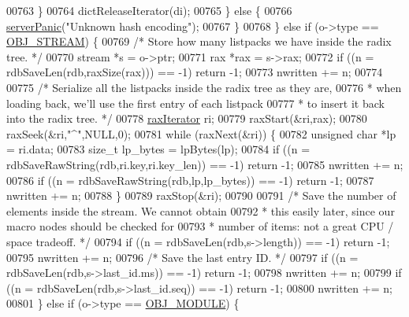 \begin{DoxyCode}
{{{{{{{{00763             \}
00764             dictReleaseIterator(di);
00765         \} \textcolor{keywordflow}{else} \{
00766             \hyperlink{server_8h_a11cc378e7778a830b41240578de3b204}{serverPanic}(\textcolor{stringliteral}{"Unknown hash encoding"});
00767         \}
00768     \} \textcolor{keywordflow}{else} \textcolor{keywordflow}{if} (o->type == \hyperlink{server_8h_a2c2cc41300ca6b9daca7ea8a6d66edc6}{OBJ\_STREAM}) \{
00769         \textcolor{comment}{/* Store how many listpacks we have inside the radix tree. */}
00770         stream *s = o->ptr;
00771         rax *rax = s->rax;
00772         \textcolor{keywordflow}{if} ((n = rdbSaveLen(rdb,raxSize(rax))) == -1) \textcolor{keywordflow}{return} -1;
00773         nwritten += n;
00774 
00775         \textcolor{comment}{/* Serialize all the listpacks inside the radix tree as they are,}
00776 \textcolor{comment}{         * when loading back, we'll use the first entry of each listpack}
00777 \textcolor{comment}{         * to insert it back into the radix tree. */}
00778         \hyperlink{structraxIterator}{raxIterator} ri;
00779         raxStart(&ri,rax);
00780         raxSeek(&ri,\textcolor{stringliteral}{"^"},NULL,0);
00781         \textcolor{keywordflow}{while} (raxNext(&ri)) \{
00782             \textcolor{keywordtype}{unsigned} \textcolor{keywordtype}{char} *lp = ri.data;
00783             size\_t lp\_bytes = lpBytes(lp);
00784             \textcolor{keywordflow}{if} ((n = rdbSaveRawString(rdb,ri.key,ri.key\_len)) == -1) \textcolor{keywordflow}{return} -1;
00785             nwritten += n;
00786             \textcolor{keywordflow}{if} ((n = rdbSaveRawString(rdb,lp,lp\_bytes)) == -1) \textcolor{keywordflow}{return} -1;
00787             nwritten += n;
00788         \}
00789         raxStop(&ri);
00790 
00791         \textcolor{comment}{/* Save the number of elements inside the stream. We cannot obtain}
00792 \textcolor{comment}{         * this easily later, since our macro nodes should be checked for}
00793 \textcolor{comment}{         * number of items: not a great CPU / space tradeoff. */}
00794         \textcolor{keywordflow}{if} ((n = rdbSaveLen(rdb,s->length)) == -1) \textcolor{keywordflow}{return} -1;
00795         nwritten += n;
00796         \textcolor{comment}{/* Save the last entry ID. */}
00797         \textcolor{keywordflow}{if} ((n = rdbSaveLen(rdb,s->last\_id.ms)) == -1) \textcolor{keywordflow}{return} -1;
00798         nwritten += n;
00799         \textcolor{keywordflow}{if} ((n = rdbSaveLen(rdb,s->last\_id.seq)) == -1) \textcolor{keywordflow}{return} -1;
00800         nwritten += n;
00801     \} \textcolor{keywordflow}{else} \textcolor{keywordflow}{if} (o->type == \hyperlink{server_8h_a92c1fed85f709180fda0ff10d37d649b}{OBJ\_MODULE}) \{
}}}}}}}}
\end{DoxyCode}
